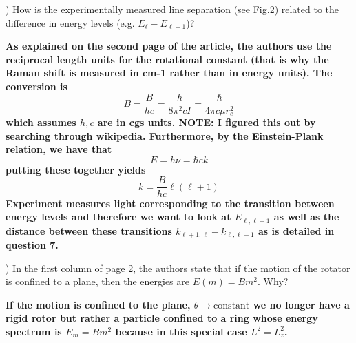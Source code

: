 \documentclass[a4paper, 11pt]{article}
\newenvironment{solution}{%
	\begin{list}{}{%
			\setlength{\topsep}{0pt}%
			\setlength{\leftmargin}{1.5cm}%
			\setlength{\rightmargin}{1.5cm}%
			\setlength{\listparindent}{\parindent}%
			\setlength{\itemindent}{\parindent}%
			\setlength{\parsep}{\parskip}%
		}%
		\item[]}{\end{list}}
\begin{document}
) How is the experimentally measured line separation (see Fig.2) related to the difference in energy levels (e.g. $E_\ell-E_{\ell-1}$)?  \\
\begin{solution}\noindent\textbf{As explained on the second page of the article, the authors use the reciprocal length units for the rotational constant (that is why the Raman shift is measured in cm-1 rather than in energy units). The conversion is
    \begin{equation*}
      \overline{B} = \frac{B}{hc} = \frac{h}{8\pi^2cI} = \frac{\hbar}{4\pi c\mu r_e^2} 
    \end{equation*}
    which assumes $h,c$ are in cgs units. NOTE: I figured this out by searching through wikipedia. Furthermore, by the Einstein-Plank relation, we have that
    \begin{equation*}
      E = h\nu = \hbar c k
    \end{equation*}
    putting these together yields
    \begin{equation*}
      k = \frac{B}{\hbar c}\ell(\ell+1)
    \end{equation*}
    Experiment measures light corresponding to the transition between energy levels and therefore we want to look at $E_{\ell, \ell-1}$ as well as the distance between these transitions $k_{\ell+1,\ell}-k_{\ell,\ell-1}$ as is detailed in question 7.\\}\end{solution}


) In the first column of page 2, the authors state that if the motion of the rotator is confined to a plane, then the energies are $E(m)=Bm^2$. Why?  \\
\begin{solution}\noindent\textbf{If the motion is confined to the plane, $\theta\rightarrow  \text{constant}$ we no longer have a rigid rotor but rather a particle confined to a ring whose energy spectrum is $E_m = Bm^2$ because in this special case $L^2=L_z^2$.\\}\end{solution}
\end{document}
